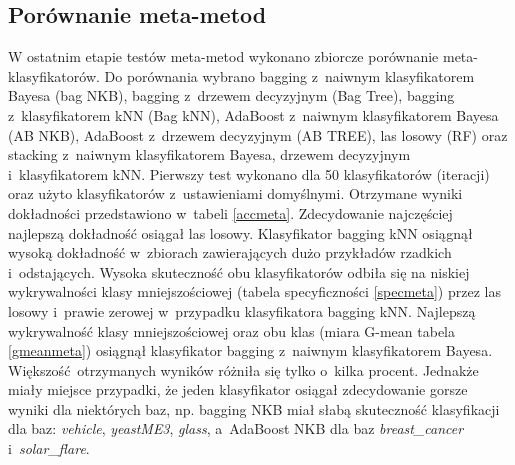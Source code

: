 \subsection{Porównanie meta-metod}
W ostatnim etapie testów meta-metod wykonano zbiorcze porównanie meta-klasyfikatorów. Do porównania wybrano bagging z~naiwnym klasyfikatorem Bayesa (bag NKB), bagging z~drzewem decyzyjnym (Bag Tree), bagging z~klasyfikatorem kNN (Bag kNN), AdaBoost z~naiwnym klasyfikatorem Bayesa (AB NKB), AdaBoost z~drzewem decyzyjnym (AB TREE), las losowy (RF) oraz stacking z~naiwnym klasyfikatorem Bayesa, drzewem decyzyjnym i~klasyfikatorem kNN. Pierwszy test wykonano dla 50 klasyfikatorów (iteracji) oraz użyto klasyfikatorów z~ustawieniami domyślnymi. Otrzymane wyniki dokładności przedstawiono w~tabeli \ref{accmeta}. Zdecydowanie najczęściej najlepszą dokładność osiągał las losowy. Klasyfikator bagging kNN osiągnął wysoką dokładność w~zbiorach zawierających dużo przykładów rzadkich i~odstających. Wysoka skuteczność obu klasyfikatorów odbiła się na niskiej wykrywalności klasy mniejszościowej (tabela specyficzności \ref{specmeta}) przez las losowy i~prawie zerowej w~przypadku klasyfikatora bagging kNN. Najlepszą wykrywalność klasy mniejszościowej oraz obu klas (miara G-mean tabela \ref{gmeanmeta}) osiągnął klasyfikator bagging z~naiwnym klasyfikatorem Bayesa. Większość otrzymanych wyników różniła się tylko o~kilka procent. Jednakże miały miejsce przypadki, że jeden klasyfikator osiągał zdecydowanie gorsze wyniki dla niektórych baz, np. bagging NKB miał słabą skuteczność klasyfikacji dla baz: \textit{vehicle}, \textit{yeastME3}, \textit{glass}, a~AdaBoost NKB dla baz \textit{breast\_cancer} i~\textit{solar\_flare}.

